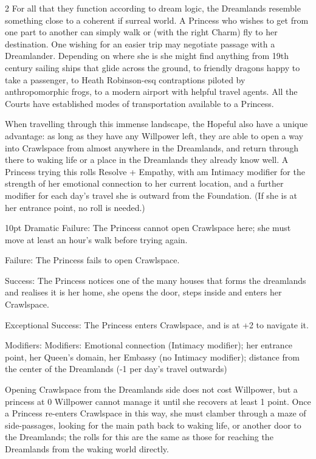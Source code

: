 \begin{multicols}{2}
For all that they function according to dream logic, the Dreamlands resemble something close to a coherent if surreal world. A Princess who wishes to get from one part to another can simply walk or (with the right Charm) fly to her destination. One wishing for an easier trip may negotiate passage with a Dreamlander. Depending on where she is she might find anything from 19th century sailing ships that glide across the ground, to friendly dragons happy to take a passenger, to Heath Robinson-esq contraptions piloted by anthropomorphic frogs, to a modern airport with helpful travel agents. All the Courts have established modes of transportation available to a Princess.

When travelling through this immense landscape, the Hopeful also have a unique advantage: as long as they have any Willpower left, they are able to open a way into Crawlspace from almost anywhere in the Dreamlands, and return through there to waking life or a place in the Dreamlands they already know well. A Princess trying this rolls Resolve + Empathy, with am Intimacy modifier for the strength of her emotional connection to her current location, and a further modifier for each day's travel she is outward from the Foundation. (If she is at her entrance point, no roll is needed.)

 \begin{myindentpar}{10pt}   Dramatic Failure: The Princess cannot open Crawlspace here; she must move at least an hour's walk before trying again.
 
    Failure: The Princess fails to open Crawlspace.
    
    Success: The Princess notices one of the many houses that forms the dreamlands and realises it is her home, she opens the door, steps inside and enters her Crawlspace.
    
    Exceptional Success: The Princess enters Crawlspace, and is at +2 to navigate it.
    
    Modifiers: Modifiers: Emotional connection (Intimacy modifier); her entrance point, her Queen's domain, her Embassy (no Intimacy modifier); distance from the center of the Dreamlands (-1 per day's travel outwards)\end{myindentpar}

Opening Crawlspace from the Dreamlands side does not cost Willpower, but a princess at 0 Willpower cannot manage it until she recovers at least 1 point. Once a Princess re-enters Crawlspace in this way, she must clamber through a maze of side-passages, looking for the main path back to waking life, or another door to the Dreamlands; the rolls for this are the same as those for reaching the Dreamlands from the waking world directly. 


\end{multicols}
